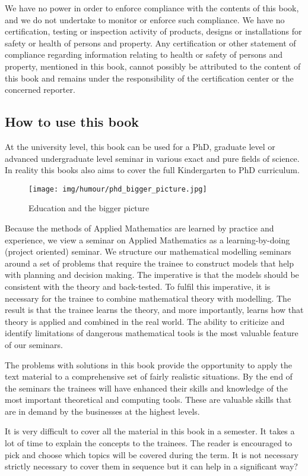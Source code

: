 	We have no power in order to enforce compliance with the contents of this book, and we do not undertake to monitor or enforce such compliance. We have no certification, testing or inspection activity of products, designs or installations for safety or health of persons and property. Any certification or other statement of compliance regarding information relating to health or safety of persons and property, mentioned in this book, cannot possibly be attributed to the content of this book and remains under the responsibility of the certification center or the concerned reporter.

	\pagebreak	
	\subsection{How to use this book}
	At the university level, this book can be used for a PhD, graduate level or advanced undergraduate level seminar in various exact and pure fields of science. In reality this books also aims to cover the full Kindergarten to PhD curriculum.
	\begin{figure}[H]
		\centering
		\texttt{[image: img/humour/phd\_bigger\_picture.jpg]}
		\caption[]{Education and the bigger picture}
	\end{figure}
	Because the methods of Applied Mathematics are learned by practice and experience, we view a seminar on Applied Mathematics as a learning-by-doing (project oriented) seminar. We structure our mathematical modelling seminars around a set of problems that require the trainee to construct models that help with planning and decision making. The imperative is that the models should be consistent with the theory and back-tested. To fulfil this imperative, it is necessary for the trainee to combine mathematical theory with modelling. The result is that the trainee learns the theory, and more importantly, learns how that theory is applied and combined in the real world. The ability to criticize and identify limitations of dangerous mathematical tools is the most valuable feature of our seminars.

	The problems with solutions in this book provide the opportunity to apply the text material to a comprehensive set of fairly realistic situations. By the end of the seminars the trainees will have enhanced their skills and knowledge of the most important theoretical and computing tools. These are valuable skills that are in demand by the businesses at the highest levels.

	It is very difficult to cover all the material in this book in a semester. It takes a lot of time to explain the concepts to the trainees. The reader is encouraged to pick and choose which topics will be covered during the term. It is not necessary strictly necessary to cover them in sequence but it can help in a significant way?

